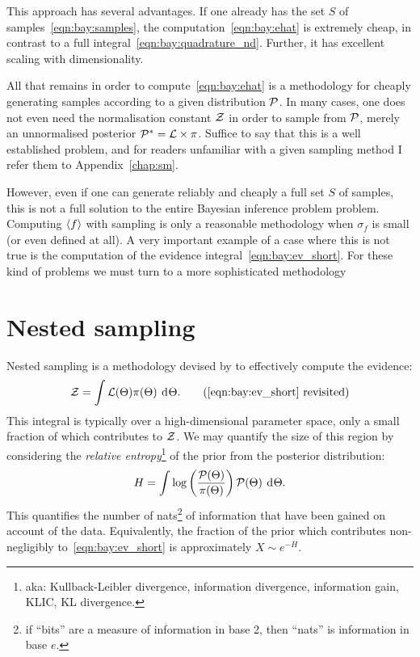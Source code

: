 This approach has several advantages. If one already has the set $S$ of samples~\eqref{eqn:bay:samples}, the computation~\eqref{eqn:bay:ehat} is extremely cheap, in contrast to a full integral~\eqref{eqn:bay:quadrature_nd}. Further, it has excellent scaling with dimensionality. 

All that remains in order to compute~\eqref{eqn:bay:ehat} is a methodology for cheaply generating samples according to a given distribution $\mathcal{P}$. In many cases, one does not even need the normalisation constant $\mathcal{Z}$ in order to sample from $\mathcal{P}$, merely an unnormalised posterior ${\mathcal{P}}^\ast= \mathcal{L}\times\pi$. Suffice to say that this is a well established problem, and for readers unfamiliar with a given sampling method I refer them to Appendix~\ref{chap:sm}.

However, even if one can generate reliably and cheaply a full set $S$ of samples, this is not a full solution to the entire Bayesian inference problem problem. Computing ${\left\langle{f}\right\rangle}$ with sampling is only a reasonable methodology when $\sigma_f$ is small (or even defined at all). A very important example of a case where this is not true is the computation of the evidence integral~\eqref{eqn:bay:ev_short}. For these kind of problems we must turn to a more sophisticated methodology



\section{Nested sampling}
\label{sec:bay:nested_sampling}
%
Nested sampling is a methodology devised by \citet{skilling2006} to effectively compute the evidence:
\begin{equation}
  \ev = \int \lik(\params) \prior(\params) \: \d{\params}.
  \tag{\ref{eqn:bay:ev_short} revisited}
\end{equation}
This integral is typically over a high-dimensional parameter space, only a small fraction of which contributes to $\mathcal{Z}$. We may quantify the size of this region by considering the {\em relative entropy\/}\footnote{aka: Kullback-Leibler divergence, information divergence, information gain, KLIC, KL divergence.} of the prior from the posterior distribution:
\begin{equation}
  H = \int \log\left( \frac{\mathcal{P}(\Theta)}{\pi(\Theta)}\right) \mathcal{P}(\Theta)\: \operatorname{d}^{}\!{\Theta}.
  \label{eqn:bay:rel_ent}
\end{equation}  
This quantifies the number of nats\footnote{if ``bits'' are a measure of information in base 2, then ``nats'' is information in base $e$.} of information that have been gained on account of the data. Equivalently, the fraction of the prior which contributes non-negligibly to~\eqref{eqn:bay:ev_short} is approximately $X\sim e^{-H}$.

